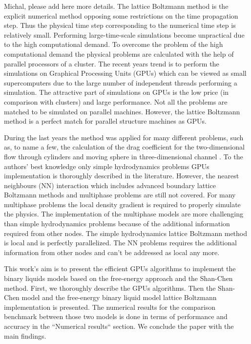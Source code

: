 \documentclass[mathpazo,sort,numbers]{cicp}
\begin{document}
{\color{red} Michal, please add here more details.}
The lattice Boltzmann method is the explicit numerical method opposing some restrictions on the time propagation step. Thus the physical time step corresponding to the numerical time step is relatively small. Performing large-time-scale simulations become unpractical due to the high computational demand. To overcome the problem of the high computational demand the physical problems are calculated with the help of parallel processors of a cluster. The recent years trend is to perform the simulations on Graphical Processing Units (GPUs) which can be viewed as small supercomputers due to the large number of independent threads performing a simulation. The attractive part of simulations on GPUs is the low price (in comparison with clusters) and large performance. Not all the problems are matched to be simulated on parallel machines. However, the lattice Boltzmann method is a perfect match for parallel structure machines as GPUs. 

During the last years the method was applied for many different problems, such as, to name a few, the calculation of the drag coefficient for the two-dimensional flow through cylinders \cite{tolke-twod} and moving sphere in three-dimensional channel \cite{tolke-GPU}. To the authors' best knowledge only simple hydrodynamics problems GPUs implementation is thoroughly described in the literature. However, the nearest neighbours (NN) interaction which includes advanced boundary lattice Boltzmann methods and multiphase problems are still not covered. For many multiphase problems the local density gradient is required to properly simulate the physics. The implementation of the multiphase models are more challenging than simple hydrodynamics problems because of the additional information required from other nodes. The simple hydrodynamics lattice Boltzmann method is local and is perfectly parallelized. The NN problems requires the additional information from other nodes and can't be addressed as local any more. 

This work's aim is to present the efficient GPUs algorithms to implement the binary liquids models based on the free-energy approach and the Shan-Chen method. First, we thoroughly describe the GPUs algorithms. Then the Shan-Chen model and the free-energy binary liquid model lattice Boltzmann implementation is presented. The numerical results for the comparison benchmark between those two models is done in terms of performance and accuracy in the ``Numerical results`` section. We conclude the paper with the main findings.
\end{document}
